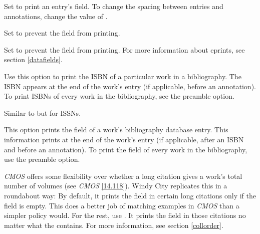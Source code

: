\documentclass[11pt,letterpaper,oneside]{article}
\begin{document}
\begin{optionlist}


\noindent Set  to print an entry's 
field. To change the spacing between entries and annotations, change
the value of .


\noindent Set  to prevent the  field from
printing.


\noindent Set  to prevent the  field from
printing. For more information about eprints, see section
\ref{datafields}.


\noindent Use this option to print the ISBN of a particular work in a
bibliography. The ISBN appears at the end of the work's entry (if
applicable, before an annotation). To print ISBNs of every work in the
bibliography, see the  preamble option.


\noindent Similar to  but for ISSNs.


\noindent This option prints the  field of a work's
bibliography database entry. This information prints at the end of the
work's entry (if applicable, after an ISBN and before an annotation).
To print the  field of every work in the
bibliography, use the  preamble option.


\noindent \textit{CMOS} offers some flexibility over whether a long
citation gives a work's total number of volumes (see \textit{CMOS}
\ref{14.118}). Windy City replicates this in a roundabout way: By
default, it prints the  field in certain long
citations only if the  field is empty. This does a
better job of matching examples in \textit{CMOS} than a simpler policy
would. For the rest, use . It prints the
 field in those citations no matter what the
 contains. For more information, see section
\ref{collorder}.


\end{optionlist}
\end{document}
